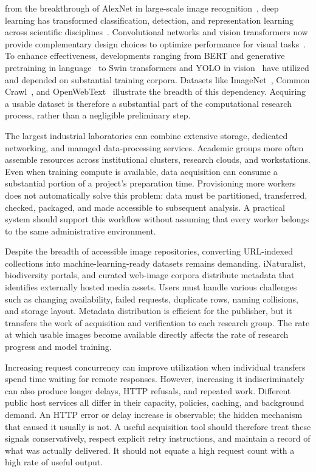  from the breakthrough of AlexNet in large-scale image recognition~\cite{AlexNet}, deep learning has transformed classification, detection, and representation learning across scientific disciplines~\cite{DL-Survey}. Convolutional networks and vision transformers now provide complementary design choices to optimize performance for visual tasks~\cite{ViT,ConvNeXt}. To enhance effectiveness, developments ranging from BERT and generative pretraining in language~\cite{bert,gpt} to Swin transformers and YOLO in vision~\cite{swin,yolo} have utilized and depended on substantial training corpora. Datasets like ImageNet~\cite{imagenet}, Common Crawl~\cite{commoncrawl}, and OpenWebText~\cite{openwebtext} illustrate the breadth of this dependency. Acquiring a usable dataset is therefore a substantial part of the computational research process, rather than a negligible preliminary step.

The largest industrial laboratories can combine extensive storage, dedicated networking, and managed data-processing services. Academic groups more often assemble resources across institutional clusters, research clouds, and workstations. Even when training compute is available, data acquisition can consume a substantial portion of a project's preparation time. Provisioning more workers does not automatically solve this problem: data must be partitioned, transferred, checked, packaged, and made accessible to subsequent analysis. A practical system should support this workflow without assuming that every worker belongs to the same administrative environment.

Despite the breadth of accessible image repositories, converting URL-indexed collections into machine-learning-ready datasets remains demanding. iNaturalist, biodiversity portals, and curated web-image corpora distribute metadata that identifies externally hosted media assets. Users must handle various challenges such as changing availability, failed requests, duplicate rows, naming collisions, and storage layout. Metadata distribution is efficient for the publisher, but it transfers the work of acquisition and verification to each research group. The rate at which usable images become available directly affects the rate of research progress and model training.

Increasing request concurrency can improve utilization when individual transfers spend time waiting for remote responses. However, increasing it indiscriminately can also produce longer delays, HTTP refusals, and repeated work. Different public host services all differ in their capacity, policies, caching, and background demand. An HTTP error or delay increase is observable; the hidden mechanism that caused it usually is not. A useful acquisition tool should therefore treat these signals conservatively, respect explicit retry instructions, and maintain a record of what was actually delivered. It should not equate a high request count with a high rate of useful output.

